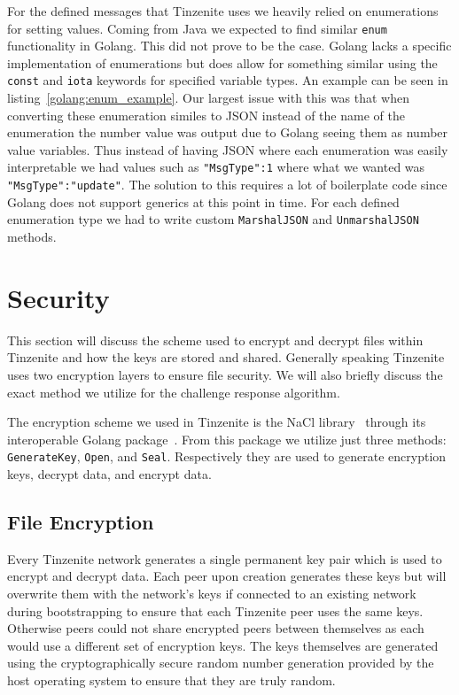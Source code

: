For the defined messages that Tinzenite uses we heavily relied on enumerations for setting values.
Coming from Java we expected to find similar \texttt{enum} functionality in Golang.
This did not prove to be the case.
Golang lacks a specific implementation of enumerations but does allow for something similar using the \texttt{const} and \texttt{iota} keywords for specified variable types.
An example can be seen in listing~\ref{golang:enum_example}.
Our largest issue with this was that when converting these enumeration similes to JSON instead of the name of the enumeration the number value was output due to Golang seeing them as number value variables.
Thus instead of having JSON where each enumeration was easily interpretable we had values such as \texttt{"MsgType":1} where what we wanted was \texttt{"MsgType":"update"}.
The solution to this requires a lot of boilerplate code since Golang does not support generics at this point in time.
For each defined enumeration type we had to write custom \texttt{MarshalJSON} and \texttt{UnmarshalJSON} methods.

\section{Security}
\label{sec:Security}

This section will discuss the scheme used to encrypt and decrypt files within Tinzenite and how the keys are stored and shared.
Generally speaking Tinzenite uses two encryption layers to ensure file security.
We will also briefly discuss the exact method we utilize for the challenge response algorithm.

The encryption scheme we used in Tinzenite is the NaCl library~\cite{bernstein2012security} through its interoperable Golang package~\cite{web:site:golang:box}.%
From this package we utilize just three methods: \texttt{GenerateKey}, \texttt{Open}, and \texttt{Seal}.
Respectively they are used to generate encryption keys, decrypt data, and encrypt data.

\subsection{File Encryption}
\label{sub:File Encryption}

Every Tinzenite network generates a single permanent key pair which is used to encrypt and decrypt data.
Each peer upon creation generates these keys but will overwrite them with the network's keys if connected to an existing network during bootstrapping to ensure that each Tinzenite peer uses the same keys.
Otherwise peers could not share encrypted peers between themselves as each would use a different set of encryption keys.
The keys themselves are generated using the cryptographically secure random number generation provided by the host operating system to ensure that they are truly random.

